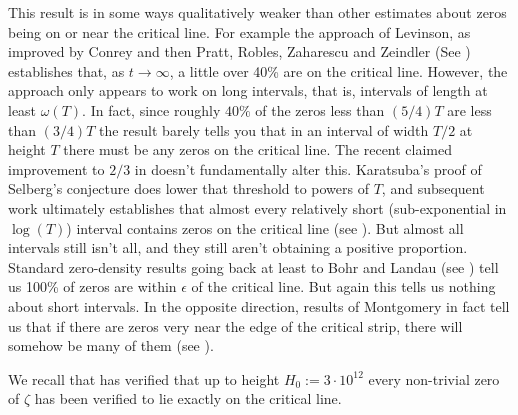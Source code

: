 \documentclass[10pt,english,letter, reqno]{amsart}
\theoremstyle{plain}
\theoremstyle{definition}
\begin{document}
This result is in some ways qualitatively weaker than other estimates about zeros being on or near the critical line. 
For example the approach of Levinson, as improved by Conrey and then Pratt, Robles, Zaharescu and Zeindler (See \cite{Levinson1974,Conrey1989,PrattEtAl2020})
establishes that, as $t\rightarrow \infty$, a little over 40\% are on the critical line. However, the approach only appears to work on long intervals, that is, intervals of length at least $\omega(T)$.
In fact, since roughly $40\%$ of the zeros less than $(5/4)T$ are less than $(3/4)T$ the result barely tells you that in an interval of width $T/2$ at height $T$ there must be any zeros on the critical line. The recent claimed improvement to $2/3$ in \cite{AlpogeFurman2026} doesn't fundamentally alter this.
Karatsuba's proof of Selberg's conjecture  does lower that threshold to powers of $T$, and subsequent work ultimately establishes that almost every relatively short (sub-exponential in $\log(T)$) interval contains zeros on the critical line (see \cite{Karatsuba1993}). But almost all intervals still isn't all, and they still aren't obtaining a positive proportion.
Standard zero-density results going back at least to Bohr and Landau (see \cite{BohrLandau1913}) tell us 100\% of zeros are within $\epsilon$ of the critical line. But again this tells us nothing about short intervals. 
In the opposite direction, results of Montgomery in fact tell us that if there are zeros very near the edge of the critical strip, there will somehow be many of them (see \cite[Chapter~11]{Montgomery1973}).

We recall that \cite{PlattTrudgian2021} has verified that up to height $H_0 := 3\cdot 10^{12}$ every non-trivial zero of $\zeta$ has been
verified to lie exactly on the critical line.
\end{document}
